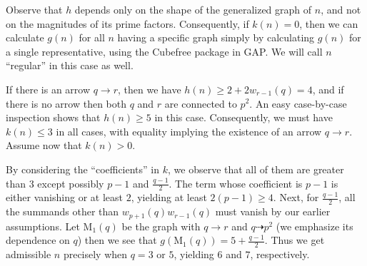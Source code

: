 \documentclass{article}
\newcommand{\m}[1]{\text{M}_{#1}}
\theoremstyle{plain}
\theoremstyle{definition}
\begin{document}
Observe that $h$ depends only on the shape of the generalized graph of $n$, and not on the magnitudes of its prime factors. Consequently, if $k(n) = 0$, then we can calculate $g(n)$ for all $n$ having a specific graph simply by calculating $g(n)$ for a single representative, using the Cubefree package in GAP{\cite{cubefreepkg}}. We will call $n$ ``regular'' in this case as well.

If there is an arrow $q \rightarrow r$, then we have $h(n) \ge 2 + 2w_{r - 1}(q) = 4$, and if there is no arrow then both $q$ and $r$ are connected to $p^2$. An easy case-by-case inspection shows that $h(n) \ge 5$ in this case. Consequently, we must have $k(n) \le 3$ in all cases, with equality implying the existence of an arrow $q \rightarrow r$. Assume now that $k(n) > 0.$

By considering the ``coefficients'' in $k$, we observe that all of them are greater than $3$ except possibly $p - 1$ and $\frac{q - 1}{2}$. The term whose coefficient is $p - 1$ is either vanishing or at least $2$, yielding at least $2(p - 1) \ge 4$. Next, for $\frac{q - 1}{2}$, all the summands other than $w_{p + 1}(q)w_{r - 1}(q)$ must vanish by our earlier assumptions. Let $\m1(q)$ be the graph with $q \rightarrow r$ and $q \dashrightarrow p^2$ (we emphasize its dependence on $q$) then we see that $g(\m1(q)) = 5 + \frac{q - 1}{2}$. Thus we get admissible $n$ precisely when $q = 3$ or $5$, yielding $6$ and $7$, respectively.
\end{document}
